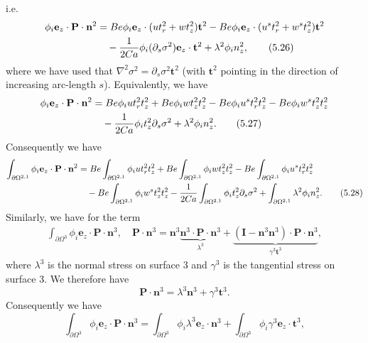\documentclass{article}
\begin{document}
i.e.
\begin{align}
\phi_i \mathbf{e}_z \cdot \mathbf{P} \cdot \mathbf{n}^2 &= Be \phi_i \mathbf{e}_z \cdot (u t_r^2 + w t_z^2) \mathbf{t}^2 - Be \phi_i \mathbf{e}_z \cdot (u^s t_r^2 + w^s t_z^2) \mathbf{t}^2 \nonumber\\
&\quad - \frac{1}{2Ca} \phi_i (\partial_s \sigma^2) \mathbf{e}_z \cdot \mathbf{t}^2 + \lambda^2 \phi_i n_z^2, \tag{5.26}
\end{align}
where we have used that $\nabla^2 \sigma^2 = \partial_s \sigma^2 \mathbf{t}^2$ (with $\mathbf{t}^2$ pointing in the direction of increasing arc-length $s$). Equivalently, we have
\begin{align}
\phi_i \mathbf{e}_z \cdot \mathbf{P} \cdot \mathbf{n}^2 &= Be \phi_i u t_r^2 t_z^2 + Be \phi_i w t_z^2 t_z^2 - Be \phi_i u^s t_r^2 t_z^2 - Be \phi_i w^s t_z^2 t_z^2 \nonumber\\
&\quad - \frac{1}{2Ca} \phi_i t_z^2 \partial_s \sigma^2 + \lambda^2 \phi_i n_z^2. \tag{5.27}
\end{align}
Consequently we have
\begin{align}
\int_{\partial \Omega^{2,1}} \phi_i \mathbf{e}_z \cdot \mathbf{P} \cdot \mathbf{n}^2 &= Be \int_{\partial \Omega^{2,1}} \phi_i u t_r^2 t_z^2 + Be \int_{\partial \Omega^{2,1}} \phi_i w t_z^2 t_z^2 - Be \int_{\partial \Omega^{2,1}} \phi_i u^s t_r^2 t_z^2 \nonumber\\
&\quad - Be \int_{\partial \Omega^{2,1}} \phi_i w^s t_z^2 t_z^2 - \frac{1}{2Ca} \int_{\partial \Omega^{2,1}} \phi_i t_z^2 \partial_s \sigma^2 + \int_{\partial \Omega^{2,1}} \lambda^2 \phi_i n_z^2. \tag{5.28}
\end{align}
Similarly, we have for the term
\begin{align}
\int_{\partial \Omega^{3}} \phi_i \mathbf{e}_z \cdot \mathbf{P} \cdot \mathbf{n}^3, \quad
\mathbf{P} \cdot \mathbf{n}^3 = \mathbf{n}^3 \underbrace{\mathbf{n}^3 \cdot \mathbf{P} \cdot \mathbf{n}^3}_{\lambda^3} + \underbrace{(\mathbf{I} - \mathbf{n}^3 \mathbf{n}^3) \cdot \mathbf{P} \cdot \mathbf{n}^3}_{\gamma^3 \mathbf{t}^3}, \tag{5.30}
\end{align}
where $\lambda^3$ is the normal stress on surface 3 and $\gamma^3$ is the tangential stress on surface 3. We therefore have
\begin{equation}
\mathbf{P} \cdot \mathbf{n}^3 = \lambda^3 \mathbf{n}^3 + \gamma^3 \mathbf{t}^3. \tag{5.31}
\end{equation}
Consequently we have
\begin{equation}
\int_{\partial \Omega^{3}} \phi_i \mathbf{e}_z \cdot \mathbf{P} \cdot \mathbf{n}^3 = \int_{\partial \Omega^{3}} \phi_i \lambda^3 \mathbf{e}_z \cdot \mathbf{n}^3 + \int_{\partial \Omega^{3}} \phi_i \gamma^3 \mathbf{e}_z \cdot \mathbf{t}^3, \tag{5.32}
\end{equation}
\end{document}

